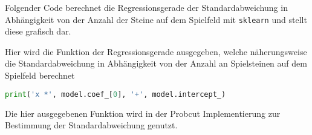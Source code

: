 Folgender Code berechnet die Regressionsgerade der Standardabweichung in
Abhängigkeit von der Anzahl der Steine auf dem Spielfeld mit
\passthrough{\lstinline!sklearn!} und stellt diese grafisch dar.

Hier wird die Funktion der Regressionsgerade ausgegeben, welche
näherungsweise die Standardabweichung in Abhängigkeit von der Anzahl an
Spielsteinen auf dem Spielfeld berechnet

\begin{lstlisting}[language=Python]
print('x *', model.coef_[0], '+', model.intercept_)
\end{lstlisting}

Die hier ausgegebenen Funktion wird in der Probcut Implementierung zur
Bestimmung der Standardabweichung genutzt.
